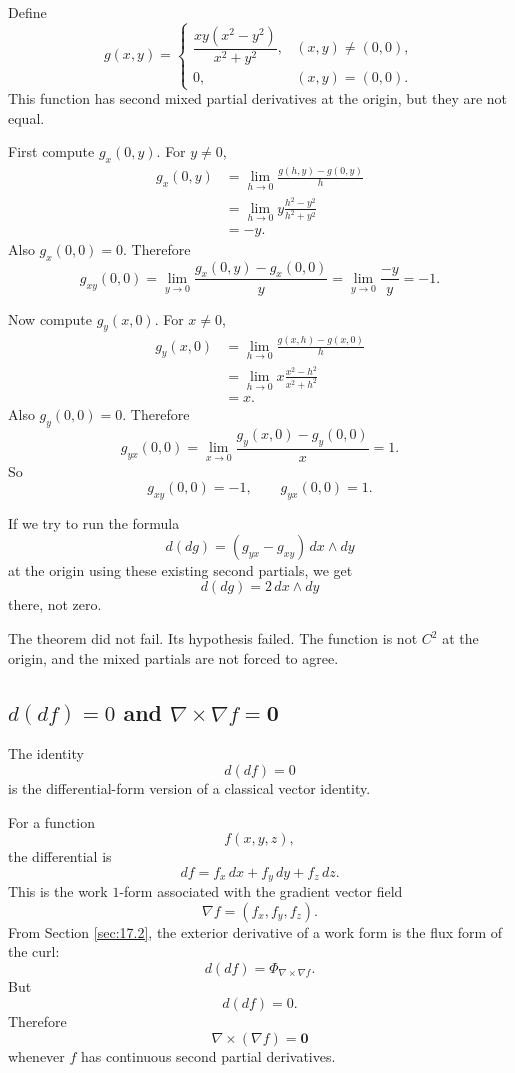 \begin{example}
Define
\[
    g(x,y)=
    \begin{cases}
    \dfrac{xy(x^2-y^2)}{x^2+y^2}, & (x,y)\ne(0,0),\\[2mm]
    0, & (x,y)=(0,0).
    \end{cases}
\]
This function has second mixed partial derivatives at the origin, but they are not
equal.

First compute \(g_x(0,y)\).  For \(y\ne0\),
\[
\begin{aligned}
g_x(0,y)
&=
\lim_{h\to0}
\frac{g(h,y)-g(0,y)}{h}\\
&=
\lim_{h\to0}
y\frac{h^2-y^2}{h^2+y^2}\\
&=
-y.
\end{aligned}
\]
Also \(g_x(0,0)=0\).  Therefore
\[
    g_{xy}(0,0)
    =
    \lim_{y\to0}\frac{g_x(0,y)-g_x(0,0)}{y}
    =
    \lim_{y\to0}\frac{-y}{y}
    =
    -1.
\]

Now compute \(g_y(x,0)\).  For \(x\ne0\),
\[
\begin{aligned}
g_y(x,0)
&=
\lim_{h\to0}
\frac{g(x,h)-g(x,0)}{h}\\
&=
\lim_{h\to0}
x\frac{x^2-h^2}{x^2+h^2}\\
&=
x.
\end{aligned}
\]
Also \(g_y(0,0)=0\).  Therefore
\[
    g_{yx}(0,0)
    =
    \lim_{x\to0}\frac{g_y(x,0)-g_y(0,0)}{x}
    =
    1.
\]
So
\[
\boxed{
    g_{xy}(0,0)=-1,
    \qquad
    g_{yx}(0,0)=1.
}
\]

If we try to run the formula
\[
    d(dg)=(g_{yx}-g_{xy})\,dx\wedge dy
\]
at the origin using these existing second partials, we get
\[
    d(dg)=2\,dx\wedge dy
\]
there, not zero.

The theorem did not fail.  Its hypothesis failed.  The function is not \(C^2\) at the
origin, and the mixed partials are not forced to agree.
\end{example}

\subsection{\texorpdfstring{\(d(df)=0\)}{d(df)=0} and
\texorpdfstring{\(\nabla\times\nabla f=\mathbf 0\)}{curl grad f = 0}}

The identity
\[
    d(df)=0
\]
is the differential-form version of a classical vector identity.

For a function
\[
    f(x,y,z),
\]
the differential is
\[
    df=f_x\,dx+f_y\,dy+f_z\,dz.
\]
This is the work \(1\)-form associated with the gradient vector field
\[
    \nabla f=(f_x,f_y,f_z).
\]
From Section \ref{sec:17.2}, the exterior derivative of a work form is the flux form
of the curl:
\[
    d(df)=\Phi_{\nabla\times\nabla f}.
\]
But
\[
    d(df)=0.
\]
Therefore
\[
\boxed{
    \nabla\times(\nabla f)=\mathbf 0
}
\]
whenever \(f\) has continuous second partial derivatives.


